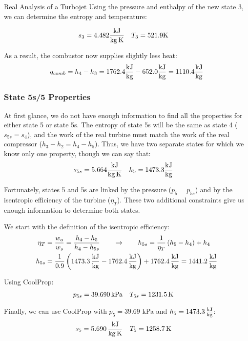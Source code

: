 \begin{example}[label=ex:turbojetReal]{Real Analysis of a Turbojet}
  Using the pressure and enthalpy of the new state 3, we can determine the entropy and temperature:
  
  \begin{align*}
    s_3 &= 4.482 \frac{\rm kJ}{\rm kg\, K} &  T_3 &= 521.9 {\rm K}
  \end{align*}

  As a result, the combustor now supplies slightly less heat:
  \begin{equation*}
    q_{comb} = h_4-h_3 = 1762.4 \frac{\rm kJ}{\rm kg} - 652.0 \frac{\rm kJ}{\rm kg} = 1110.4 \frac{\rm kJ}{\rm kg}
  \end{equation*}
  
  \subsubsection*{State 5s/5 Properties}
  At first glance, we do not have enough information to find all the properties for either state 5 or state 5s.  The entropy of state 5s will be the same as state 4 ($s_{5s}=s_4$), and the work of the real turbine must match the work of the real compressor ($h_3-h_2 = h_4-h_5$).  Thus, we have two separate states for which we know only one property, though we can say that:
  \begin{align*}
    s_{5s} &= 5.664 \frac{\rm kJ}{\rm kg\, K} &  h_5 &= 1473.3 \frac{\rm kJ}{\rm kg}
  \end{align*}
  
  Fortunately, states 5 and 5s are linked by the pressure ($p_5=p_{5s}$) and by the isentropic efficiency of the turbine ($\eta_T$).  These two additional constraints give us enough information to determine both states.

  We start with the definition of the isentropic efficiency:
  \begin{align*}
    \eta_T &= \frac{w_a}{w_s} = \frac{h_4-h_5}{h_4-h_{5s}} \qquad \rightarrow \qquad h_{5s} = \frac{1}{\eta_T} \left(h_5 -h_4\right) + h_4 \\
    h_{5s} &= \frac{1}{0.9} \left(1473.3\, \frac{\rm kJ}{\rm kg} -1762.4\, \frac{\rm kJ}{\rm kg}\right) + 1762.4\, \frac{\rm kJ}{\rm kg} = 1441.2\, \frac{\rm kJ}{\rm kg}
  \end{align*}

  Using CoolProp:
  \begin{align*}
    p_{5s} &= 39.690 {\rm\, kPa} & T_{5s} &= 1231.5 {\rm\, K} 
  \end{align*}

  Finally, we can use CoolProp with $p_5 = 39.69$ kPa and $h_5 = 1473.3\, \frac{\rm kJ}{\rm kg}$:
  \begin{align*}
    s_5 &= 5.690\, \frac{\rm kJ}{\rm kg\, K} &  T_5 &= 1258.7\, {\rm K}
  \end{align*}


\end{example}
